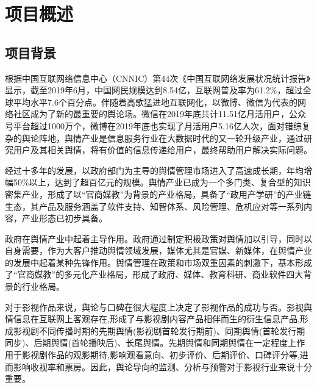 \section{项目概述}

\subsection{项目背景}
    	根据中国互联网络信息中心（CNNIC）第44次《中国互联网络发展状况统计报告》显示，截至2019年6月，中国网民规模达到8.54亿，互联网普及率为61.2\%，超过全球平均水平7.6个百分点。伴随着高歌猛进地互联网化，以微博、微信为代表的网络社区成为了新的最重要的舆论场。微信在2019年底共计11.51亿月活用户，公众号平台超过1000万个，微博在2019年底也实现了月活用户5.16亿人次，面对错综复杂的舆论阵地，舆情产业是信息服务行业在大数据时代的又一轮升级产业，通过研究用户及其相关舆情，将有价值的信息传递给用户，最终帮助用户解决实际问题。
    
 经过十多年的发展，以政府部门为主导的舆情管理市场进入了高速成长期，年均增幅50\%以上，达到了超百亿元的规模。舆情产业已成为一个多门类、复合型的知识密集产业，形成了以“官商媒教”为背景的产业格局，具备了“政用产学研”的产业链生态，其产品及服务涵盖了软件支持、知智体系、风险管理、危机应对等一系列内容，产业形态已初步具备。
 
 政府在舆情产业中起着主导作用。政府通过制定积极政策对舆情加以引导，同时以自身需要，作为大客户推动舆情领域发展，媒体尤其是官媒、新媒体，在舆情产业的发展中起着某种先锋作用。舆情管理在政策和市场双重因素的刺激下，基本形成了“官商媒教”的多元化产业格局，形成了政府、媒体、教育科研、商业软件四大背景的行业格局。
 
 对于影视作品来说，舆论与口碑在很大程度上决定了影视作品的成功与否。影视舆情信息在互联网上客观存在,形成了与影视剧内容产品相伴而生的衍生信息产品,形成影视剧不同传播时期的先期舆情(影视剧首轮发行期前)、同期舆情(首轮发行期同步)、后期舆情(首轮播映后)、长尾舆情。先期舆情和同期舆情在一定程度上作用于影视剧作品的观影期待,影响观看意向、初步评价、后期评价、口碑评分等,进而影响收视率和票房。因此，舆论导向的监测、分析与预警对于影视行业来说十分重要。


